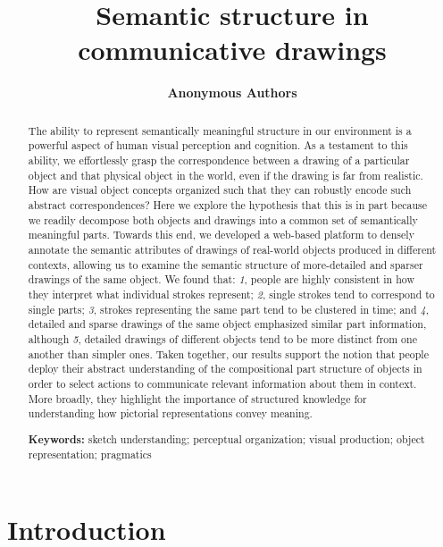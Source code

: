 \documentclass[10pt,letterpaper]{article}
\title{Semantic structure in communicative drawings}
\author{\large \bf Anonymous Authors}
\begin{document}
\maketitle 

\begin{abstract}

The ability to represent semantically meaningful structure in our environment is a powerful aspect of human visual perception and cognition. 
As a testament to this ability, we effortlessly grasp the correspondence between a drawing of a particular object and that physical object in the world, even if the drawing is far from realistic. 
How are visual object concepts organized such that they can robustly encode such abstract correspondences?
Here we explore the hypothesis that this is in part because we readily decompose both objects and drawings into a common set of semantically meaningful parts. 
Towards this end, we developed a web-based platform to densely annotate the semantic attributes of drawings of real-world objects produced in different contexts, allowing us to examine the semantic structure of more-detailed and sparser drawings of the same object. 
We found that: \textit{1}, people are highly consistent in how they interpret what individual strokes represent; \textit{2}, single strokes tend to correspond to single parts; \textit{3}, strokes representing the same part tend to be clustered in time; and \textit{4}, detailed and sparse drawings of the same object emphasized similar part information, although \textit{5}, detailed drawings of different objects tend to be more distinct from one another than simpler ones. 
Taken together, our results support the notion that people deploy their abstract understanding of the compositional part structure of objects in order to select actions to communicate relevant information about them in context. 
More broadly, they highlight the importance of structured knowledge for understanding how pictorial representations convey meaning. 

\textbf{Keywords:} 
sketch understanding; perceptual organization; visual production; object representation; pragmatics
\end{abstract}

\section{Introduction}

\end{document}
